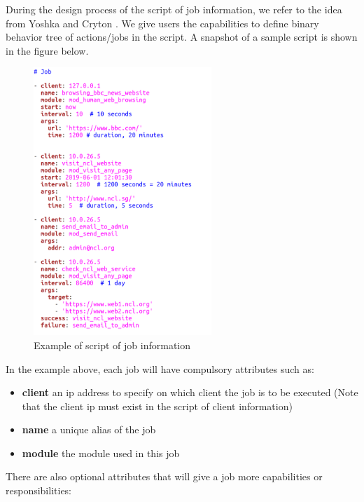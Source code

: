 \documentclass[12pt]{report}
\begin{document}
During the design process of the script of job information, we refer to the idea from Yoshka \cite{Yoshka} and Cryton \citep{Cryton}. We give users the capabilities to define binary behavior tree of actions/jobs in the script. A snapshot of a sample script is shown in the figure below.\\

\begin{figure}[h!]
	\centering
	\includegraphics[width=0.6\textwidth]{./pictures/job-template}
	\caption{Example of script of job information}
\end{figure}

In the example above, each job will have compulsory attributes such as:

\begin{itemize}
\item \textbf{client} an ip address to specify on which client the job is to be executed (Note that the client ip must exist in the script of client information)
\item \textbf{name} a unique alias of the job
\item \textbf{module} the module used in this job
\end{itemize}

There are also optional attributes that will give a job more capabilities or responsibilities:
\end{document}
